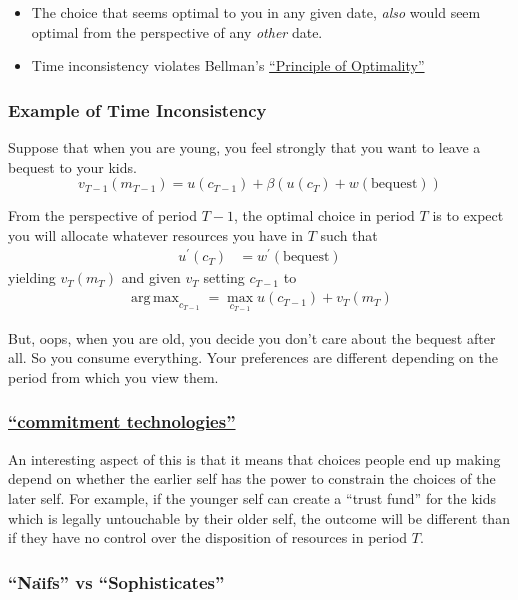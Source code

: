 \documentclass{scrartcl}
\DeclareMathOperator*{\argmax}{arg\,max}
\begin{document}
\begin{itemize}
\item The choice that seems optimal to you in any given date, \emph{also} would seem optimal from the perspective of any \emph{other} date.
\item Time inconsistency violates Bellman's \href{https://www.ques10.com/p/8343/bellmans-principle-of-optimality}{``Principle of Optimality''}
\end{itemize}

\label{example-of-time-inconsistency}
\subsubsection*{Example of Time Inconsistency}

Suppose that when you are young, you feel strongly that you want to leave a bequest to your kids.
\[ v_{T-1}(m_{T-1}) = u(c_{T-1}) + \beta \left(u(c_{T}) + w(\text{bequest})\right)
\]

From the perspective of period $T-1$, the optimal choice in period $T$ is to expect you will allocate whatever resources you have in $T$ such that
\begin{align}
u^{\prime}(c_{T}) &= w^{\prime}(\text{bequest})
\end{align}
yielding $v_{T}(m_{T})$ and given $v_{T}$ setting $c_{T-1}$ to 
\begin{align}
  \argmax_{c_{T-1}} = \max_{c_{T-1}} u(c_{T-1}) + v_{T}(m_{T})
\end{align}

But, oops, when you are old, you decide you don't care about the bequest after all.  So you consume everything.  Your preferences are different depending on the period from which you view them.

\subsubsection*{\href{https://en.wikipedia.org/wiki/Commitment_device}{``commitment technologies''}}
An interesting aspect of this is that it means that choices people end up making depend on whether the earlier self has the power to constrain the choices of the later self.  For example, if the younger self can create a ``trust fund'' for the kids which is legally untouchable by their older self, the outcome will be different than if they have no control over the disposition of resources in period $T$.

\subsubsection*{``Na\"{\i}fs'' vs ``Sophisticates''}
\end{document}
